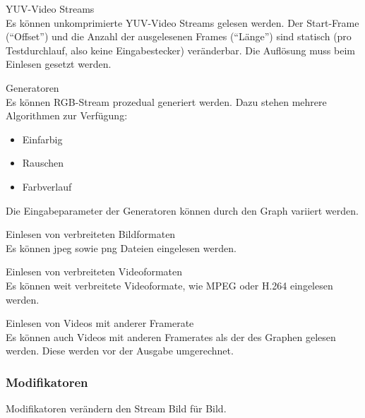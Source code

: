 \begin{speclist}[F]
\setcounter{specnum}{21010}

\spec YUV-Video Streams \\
Es können unkomprimierte YUV-Video Streams gelesen werden. Der Start-Frame ("`Offset"') und die Anzahl der ausgelesenen Frames ("`Länge"') sind statisch (pro Testdurchlauf, also keine Eingabestecker) veränderbar. Die Auflösung muss beim Einlesen gesetzt werden.

\spec Generatoren \\
Es können RGB-Stream prozedual generiert werden. Dazu stehen mehrere Algorithmen zur Verfügung:
\begin{itemize}
	\item Einfarbig
	\item Rauschen
	\item Farbverlauf
\end{itemize}
Die Eingabeparameter der Generatoren können durch den Graph variiert werden.

\spec Einlesen von verbreiteten Bildformaten \\
Es können jpeg sowie png Dateien eingelesen werden.

\optspec Einlesen von verbreiteten Videoformaten \\
Es können weit verbreitete Videoformate, wie MPEG oder H.264 eingelesen werden.

\optspec Einlesen von Videos mit anderer Framerate \\
Es können auch Videos mit anderen Framerates als der des Graphen gelesen werden. Diese werden vor der Ausgabe umgerechnet.

\end{speclist}

\subsubsection{Modifikatoren}
Modifikatoren verändern den Stream Bild für Bild.

